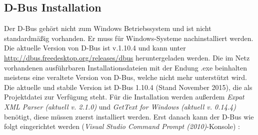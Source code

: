 \subsection{D-Bus Installation}
Der D-Bus gehört nicht zum Windows Betriebssystem und ist nicht standardmäßig vorhanden. Er muss für Windows-Systeme nachinstalliert werden. Die aktuelle Version von D-Bus ist v.1.10.4 und kann unter \url{http://dbus.freedesktop.org/releases/dbus} heruntergeladen werden. Die im Netz vorhandenen ausführbaren Installationsdateien mit der Endung .exe beinhalten meistens eine veraltete Version von D-Bus, welche nicht mehr unterstützt wird. Die aktuelle und stabile Version ist D-Bus 1.10.4 (Stand November 2015), die als Projektdatei zur Verfügung steht. Für die Installation werden außerdem \textit{Expat XML Parser (aktuell v. 2.1.0)} und \textit{GetText for Windows (aktuell v. 0.14.4)} benötigt, diese müssen zuerst installiert werden. Erst danach kann der D-Bus wie folgt eingerichtet werden (\textit{Visual Studio Command Prompt (2010)}-Konsole) :
